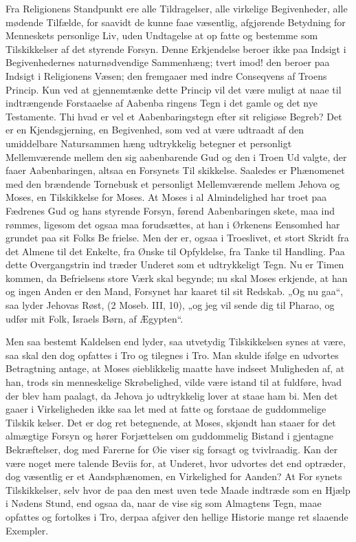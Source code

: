 \documentclass[12pt]{book}
\newcommand{\opage}[1]{\marginnote{\footnotesize\textit{[#1]}}}
\begin{document}
Fra Religionens Standpunkt ere alle Tildragelser,
alle virkelige Begivenheder, alle mødende Tilfælde, for\-%
saavidt de kunne faae væsentlig, afgjørende Betydning
for Menneskets personlige Liv, uden Undtagelse at op\-%
fatte og bestemme som Tilskikkelser af det styrende
Forsyn. Denne Erkjendelse beroer ikke paa Indsigt i
Begivenhedernes naturnødvendige Sammenhæng; tvert\-%
imod! den beroer paa Indsigt i Religionens Væsen; den
fremgaaer med indre Conseqvens af Troens Princip.
Kun ved at gjennemtænke dette Princip vil det være
muligt at naae til indtrængende Forstaaelse af Aabenba\-%
ringens Tegn i det gamle og det nye Testamente. Thi
hvad er vel et Aabenbaringstegn efter sit religiøse
Begreb? Det er en Kjendsgjerning, en Begivenhed, som
ved at være udtraadt af den umiddelbare Natursammen\-%
hæng udtrykkelig betegner et personligt Mellemværende
mellem den sig aabenbarende Gud og den i Troen Ud\-%
valgte, der faaer Aabenbaringen, altsaa en Forsynets Til\-%
\opage{214}\setcounter{footnote}{0}%
skikkelse. Saaledes er Phænomenet med den brændende
Tornebusk et personligt Mellemværende mellem Jehova
og Moses, en Tilskikkelse for Moses. At Moses i al
Almindelighed har troet paa Fædrenes Gud og hans
styrende Forsyn, førend Aabenbaringen skete, maa ind\-%
rømmes, ligesom det ogsaa maa forudsættes, at han i
Ørkenens Eensomhed har grundet paa sit Folks Be\-%
frielse. Men der er, ogsaa i Troeslivet, et stort Skridt
fra det Almene til det Enkelte, fra Ønske til Opfyldelse,
fra Tanke til Handling. Paa dette Overgangstrin ind\-%
træder Underet som et udtrykkeligt Tegn. Nu er Timen
kommen, da Befrielsens store Værk skal begynde; nu
skal Moses erkjende, at han og ingen Anden er den
Mand, Forsynet har kaaret til sit Redskab. „Og nu
gaa“, saa lyder Jehovas Røst, (2 Moseb. III, 10), „og
jeg vil sende dig til Pharao, og udfør mit Folk, Israels
Børn, af Ægypten“.

Men saa bestemt Kaldelsen end lyder, saa utvetydig
Tilskikkelsen synes at være, saa skal den dog opfattes
i Tro og tilegnes i Tro. Man skulde ifølge en udvortes
Betragtning antage, at Moses øieblikkelig maatte have
indseet Muligheden af, at han, trods sin menneskelige
Skrøbelighed, vilde være istand til at fuldføre, hvad der
blev ham paalagt, da Jehova jo udtrykkelig lover at
staae ham bi. Men det gaaer i Virkeligheden ikke saa
let med at fatte og forstaae de guddommelige Tilskik\-%
kelser. Det er dog ret betegnende, at Moses, skjøndt han
staaer for det almægtige Forsyn og hører Forjættelsen
om guddommelig Bistand i gjentagne Bekræftelser, dog
med Farerne for Øie viser sig forsagt og tvivlraadig.
Kan der være noget mere talende Beviis for, at Underet,
hvor udvortes det end optræder, dog væsentlig er et
Aandsphænomen, en Virkelighed for Aanden? At For\-%
synets Tilskikkelser, selv hvor de paa den mest uven\-%
\opage{215}\setcounter{footnote}{0}%
tede Maade indtræde som en Hjælp i Nødens Stund, end\-%
ogsaa da, naar de vise sig som Almagtens Tegn, maae
opfattes og fortolkes i Tro, derpaa afgiver den hellige
Historie mange ret slaaende Exempler.
\end{document}
